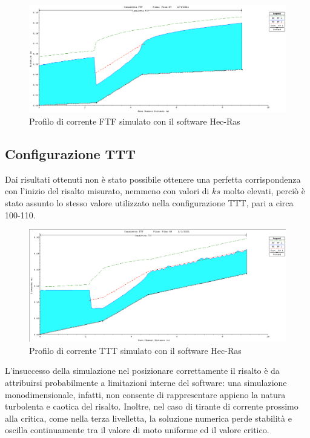 \documentclass[12pt]{article} %
\begin{document}
\begin{figure}[H]
    \centering
    \includegraphics[scale=0.3]{Profilo HEC-RAS FTF.png}
    \caption{Profilo di corrente FTF simulato con il software Hec-Ras}
\end{figure}

\subsection{Configurazione TTT}

\noindent  Dai risultati ottenuti non è stato possibile ottenere una perfetta corrispondenza con l’inizio del risalto misurato, nemmeno con valori di $ks$ molto elevati, perciò è stato assunto lo stesso valore utilizzato nella configurazione TTT, pari a circa 100-110. 

\begin{figure}[H]
    \centering
    \includegraphics[scale=0.3]{Profilo HEC-RAS TTT.png}
    \caption{Profilo di corrente TTT simulato con il software Hec-Ras}

\end{figure}

\noindent L’insuccesso della simulazione nel posizionare correttamente il risalto è da attribuirsi probabilmente a limitazioni interne del software: una simulazione monodimensionale, infatti, non consente di rappresentare appieno la natura turbolenta e caotica del risalto. Inoltre, nel caso di tirante di corrente prossimo alla critica, come nella terza livelletta, la soluzione numerica perde stabilità e oscilla continuamente tra il valore di moto uniforme ed il valore critico.
\end{document}
